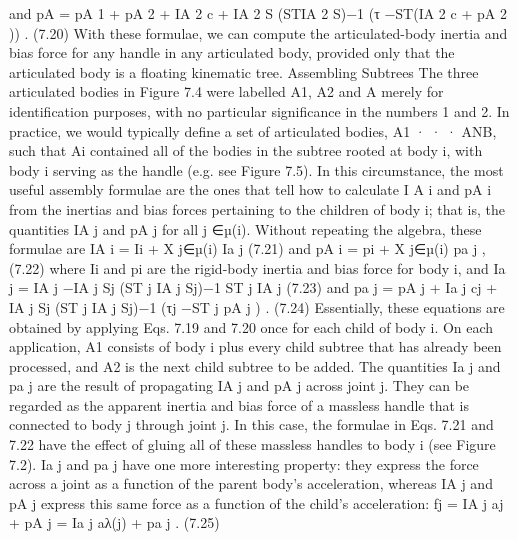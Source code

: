and pA = pA 1 + pA 2 + IA 2 c + IA 2 S (STIA 2 S)−1 (τ −ST(IA 2 c + pA 2 )) . (7.20) With these formulae, we can compute the articulated-body inertia and bias force for any handle in any articulated body, provided only that the articulated body is a floating kinematic tree. Assembling Subtrees The three articulated bodies in Figure 7.4 were labelled A1, A2 and A merely for identification purposes, with no particular significance in the numbers 1 and 2. In practice, we would typically define a set of articulated bodies, A1 · · · ANB, such that Ai contained all of the bodies in the subtree rooted at body i, with body i serving as the handle (e.g. see Figure 7.5). In this circumstance, the most useful assembly formulae are the ones that tell how to calculate I A i and pA i from the inertias and bias forces pertaining to the children of body i; that is, the quantities IA j and pA j for all j ∈µ(i). Without repeating the algebra, these formulae are IA i = Ii + X j∈µ(i) Ia j (7.21) and pA i = pi + X j∈µ(i) pa j , (7.22) where Ii and pi are the rigid-body inertia and bias force for body i, and Ia j = IA j −IA j Sj (ST j IA j Sj)−1 ST j IA j (7.23) and pa j = pA j + Ia j cj + IA j Sj (ST j IA j Sj)−1 (τj −ST j pA j ) . (7.24) Essentially, these equations are obtained by applying Eqs. 7.19 and 7.20 once for each child of body i. On each application, A1 consists of body i plus every child subtree that has already been processed, and A2 is the next child subtree to be added. The quantities Ia j and pa j are the result of propagating IA j and pA j across joint j. They can be regarded as the apparent inertia and bias force of a massless handle that is connected to body j through joint j. In this case, the formulae in Eqs. 7.21 and 7.22 have the effect of gluing all of these massless handles to body i (see Figure 7.2). Ia j and pa j have one more interesting property: they express the force across a joint as a function of the parent body’s acceleration, whereas IA j and pA j express this same force as a function of the child’s acceleration: fj = IA j aj + pA j = Ia j aλ(j) + pa j . (7.25)


